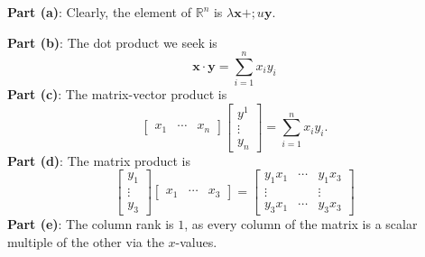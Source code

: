 \documentclass[11pt]{article}
\renewcommand{\vec}[1]{\mathbf{#1}}
\begin{document}
\textbf{Part (a)}: Clearly, the element of $\mathbb{R}^{n}$ is $\lambda \vec{x} + ;u \vec{y}$.

\textbf{Part (b)}: The dot product we seek is
\[
	\vec{x} \cdot \vec{y} = \boxed{\sum_{i = 1}^{n} x_{i}y_{i}}
\]
\textbf{Part (c)}: The matrix-vector product is
\[
	\begin{bmatrix} x_{1} & \cdots & x_{n} \end{bmatrix} \begin{bmatrix} y^{1} \\ \vdots \\ y_{n} \end{bmatrix} = \boxed{\sum_{i = 1}^{n} x_{i}y_{i}}.
\]
\textbf{Part (d)}: The matrix product is
\[
	\begin{bmatrix} y_{1} \\ \vdots \\ y_{3} \end{bmatrix} \begin{bmatrix} x_{1} & \cdots & x_{3} \end{bmatrix} = \begin{bmatrix} y_{1}x_{1} & \cdots & y_{1}x_{3} \\ \vdots & & \vdots \\ y_{3}x_{1} & \cdots & y_{3}x_{3} \end{bmatrix}
\]
\textbf{Part (e)}: The column rank is $\boxed{1}$, as every column of the matrix is a scalar multiple of the other via the $x$-values.
\end{document}

